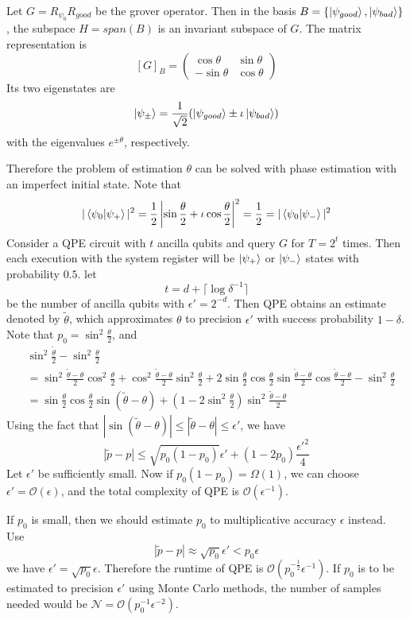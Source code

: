 Let $G=R_{\psi_0}R_{good}$ be the grover operator. Then in the basis $B=\{\ket{\psi_{good}},\ket{\psi_{bad}}\}$, the subspace $H=span(B)$ is an invariant subspace of $G$. The matrix representation is
\[
[G]_B =\begin{pmatrix} \cos \theta & \sin \theta \\ - \sin \theta & \cos\theta \end{pmatrix}
\]
Its two eigenstates are
\[
\ket{\psi_{\pm}}=\frac{1}{\sqrt{2}}(\ket{\psi_{good}} \pm \iota \ket{\psi_{bad}})
\]
with the eigenvalues $e^{\pm\theta}$, respectively.

Therefore the problem of estimation $\theta$ can be solved with phase estimation with an imperfect initial state. Note that
\[
|\braket{\psi_0|\psi_{+}}|^2=\frac{1}{2}\left|\sin \frac{\theta}{2} + \iota \cos\frac{\theta}{2} \right|^2 =\frac{1}{2}=|\braket{\psi_0|\psi_{-}}|^2
\]
Consider a QPE circuit with $t$ ancilla qubits and query $G$ for $T=2^t$ times. Then each execution with the system register will be $\ket{\psi_+}$ or $\ket{\psi_{-}}$ states with probability $0.5$. let
\[
t=d+\lceil\log \delta^{-1}\rceil
\]
be the number of ancilla qubits with $\epsilon'=2^{-d}$. Then QPE obtains an estimate denoted by $\tilde{\theta}$, which approximates $\theta$ to precision $\epsilon'$ with success probability $1-\delta$. Note that $p_0=\sin^2\frac{\theta}{2}$, and
\begin{align*}
    &\sin^2 \frac{\tilde{\theta}}{2} - \sin^2 \frac{\theta}{2}\\
    &=\sin^2\frac{\tilde{\theta}-\theta}{2}\cos^2\frac{\theta}{2}+\cos^2\frac{\tilde{\theta}-\theta}{2}\sin^2\frac{\theta}{2}+2\sin\frac{\theta}{2}\cos\frac{\theta}{2}\sin\frac{\tilde{\theta}-\theta}{2}\cos\frac{\tilde{\theta}-\theta}{2}-\sin^2\frac{\theta}{2}\\
    &=\sin\frac{\theta}{2}\cos\frac{\theta}{2}\sin(\tilde{\theta}-\theta)+\left(1-2\sin^2\frac{\theta}{2}\right)\sin^2\frac{\tilde{\theta}-\theta}{2}
\end{align*}
Using the fact that $|\sin(\tilde{\theta}-\theta)|\leq |\tilde{\theta}-\theta|\leq \epsilon'$, we have
\[
|\tilde{p}-p|\leq \sqrt{p_0(1-p_0)}\epsilon' +(1-2p_0)\frac{\epsilon'^2}{4}
\]
Let $\epsilon'$ be sufficiently small. Now if $p_0(1-p_0)=\Omega(1)$, we can choose $\epsilon'=\mathcal{O}(\epsilon)$, and the total complexity of QPE is $\mathcal{O}(\epsilon^{-1})$.

If $p_0$ is small, then we should estimate $p_0$ to multiplicative accuracy $\epsilon$ instead. Use
\[
|\tilde{p}-p|\approx \sqrt{p_0}\epsilon' <p_0\epsilon
\]
we have $\epsilon'=\sqrt{p_0}\epsilon$. Therefore the runtime of QPE is $\mathcal{O}(p_0^{-\frac{1}{2}}\epsilon^{-1})$. If $p_0$ is to be estimated to precision $\epsilon'$ using Monte Carlo methods, the number of samples needed would be $\mathcal{N}=\mathcal{O}(p_0^{-1}\epsilon^{-2})$.

